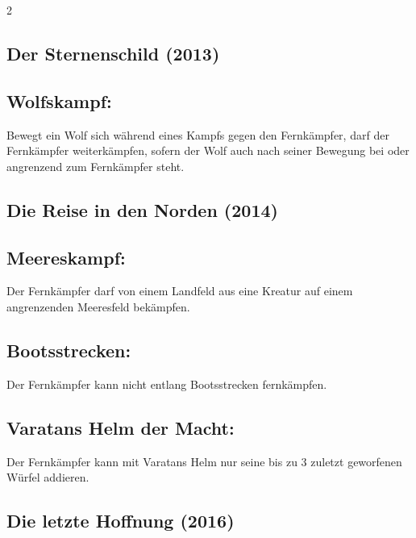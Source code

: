 \documentclass[10pt, a4paper, oneside]{book}
\begin{document}
\begin{multicols*}{2}
\begin{bgcolor}
\section{Der Sternenschild (2013)}

\subsection{Wolfskampf:}

Bewegt ein Wolf sich während eines Kampfs gegen den Fernkämpfer, darf der Fernkämpfer weiterkämpfen, sofern der Wolf auch nach seiner Bewegung bei oder angrenzend zum Fernkämpfer steht.
\supercite{stsch-begleitheft}




\end{bgcolor}


\begin{bgcolor}
\section{Die Reise in den Norden (2014)}


\subsection{Meereskampf:}

Der Fernkämpfer darf von einem Landfeld aus eine Kreatur auf einem angrenzenden Meeresfeld bekämpfen.
\supercite{dridn-begleitheft}


\subsection{Bootsstrecken:}

Der Fernkämpfer kann nicht entlang Bootsstrecken fernkämpfen.
\supercite{dridn-faq}


\subsection{Varatans Helm der Macht:}

Der Fernkämpfer kann mit Varatans Helm nur seine bis zu 3 zuletzt geworfenen Würfel addieren.
\supercite{dridn-begleitheft}

\end{bgcolor}


\begin{bgcolor}
\section{Die letzte Hoffnung (2016)}



\end{bgcolor}
\end{multicols*}
\end{document}
